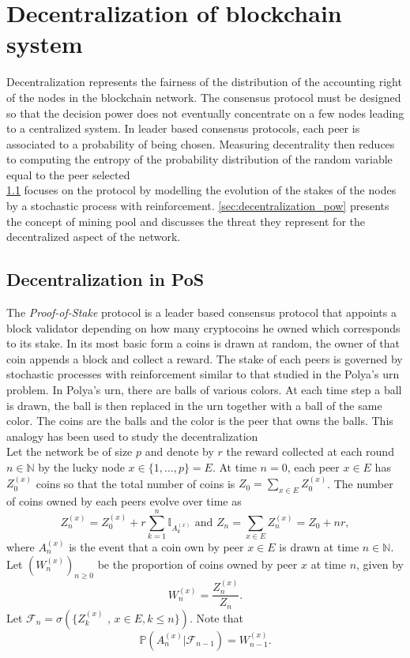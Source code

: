 \chapter{Decentralization of blockchain system}\label{chap:decentralization}
Decentralization represents the fairness of the distribution of the accounting right of the nodes in the blockchain network. The consensus protocol must be designed so that the decision power does not eventually concentrate on a few nodes leading to a centralized system. In leader based consensus protocols, each peer is associated to a probability of being chosen. Measuring decentrality then reduces to computing the entropy of the probability distribution of the random variable equal to the peer selected  \\

\noindent \cref{sec:decentralization_pos} focuses on the \PoS protocol by modelling the evolution of the stakes of the nodes by a stochastic process with reinforcement. \cref{sec:decentralization_pow} presents the concept of mining pool and discusses the threat they represent for the decentralized aspect of the network.

\section{Decentralization in PoS}\label{sec:decentralization_pos}
The \textit{Proof-of-Stake} protocol is a leader based consensus protocol that appoints a block validator depending on how many cryptocoins he owned which corresponds to its stake. In its most basic form a coins is drawn at random, the owner of that coin appends a block and collect a reward. The stake of each peers is governed by stochastic processes with reinforcement similar to that studied in the Polya's urn problem. In Polya's urn, there are balls of various colors. At each time step a ball is drawn, the ball is then replaced in the urn together with a ball of the same color. The coins are the balls and the color is the peer that owns the balls. This analogy has been used to study the decentralization\\

\noindent Let the network be of size $p$ and denote by $r$ the reward collected at each round $n\in\mathbb{N}$ by the lucky node $x\in \{1, \ldots, p\} = E$. At time $n=0$, each peer $x\in E$ has $Z^{(x)}_0$ coins so that the total number of coins is $Z_0 = \sum_{x\in E}Z^{(x)}_0$. The number of coins owned by each peers evolve over time as
$$
Z^{(x)}_n = Z^{(x)}_0 + r\sum_{k = 1}^n\mathbb{I}_{A_{k}^{(x)}}\text{ and }Z_n = \sum_{x\in E}Z^{(x)}_n = Z_0 + nr,    
$$
where $A_{n}^{(x)}$ is the event that a coin own by peer $x\in E$ is drawn at time $n\in\mathbb{N}$. Let $(W_n^{(x)})_{n\geq0}$ be the proportion of coins owned by peer $x$ at time $n$, given by 
$$
W_n^{(x)} = \frac{Z^{(x)}_n}{Z_n}. 
$$
Let $\mathcal{F}_n = \sigma(\{Z_k^{(x)}\text{ , }x\in E, k\leq n\})$. Note that 
$$
\mathbb{P}\left(A_{n}^{(x)}|\mathcal{F}_{n-1}\right) = W_{n-1}^{(x)}.
$$
